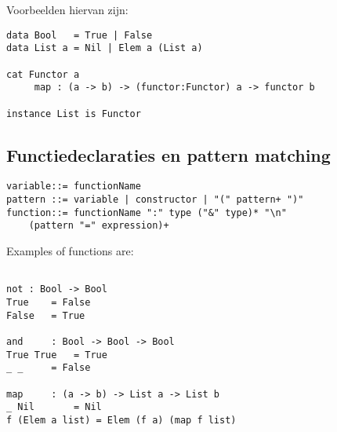 Voorbeelden hiervan zijn:

\begin{lstlisting}[backgroundcolor=\color{grey}]
data Bool 	= True | False
data List a	= Nil | Elem a (List a)

cat Functor a
     map : (a -> b) -> (functor:Functor) a -> functor b
	
instance List is Functor

\end{lstlisting}


\subsection{Functiedeclaraties en pattern matching}

\begin{lstlisting}[frame=single]
variable::= functionName
pattern	::= variable | constructor | "(" pattern+ ")"
function::= functionName ":" type ("&" type)* "\n" 
	(pattern "=" expression)+
\end{lstlisting}

Examples of functions are:

\begin{lstlisting}[backgroundcolor=\color{grey}]

not	: Bool -> Bool
True	= False
False	= True

and		: Bool -> Bool -> Bool
True True	= True
_ _		= False

map		: (a -> b) -> List a -> List b
_ Nil		= Nil
f (Elem a list)	= Elem (f a) (map f list)

\end{lstlisting}